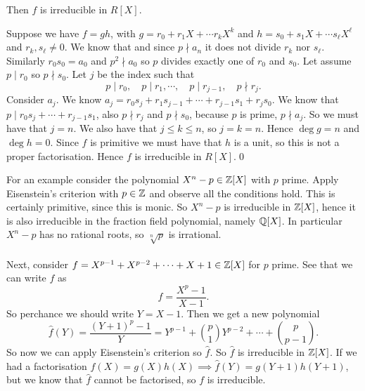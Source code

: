\documentclass{article}
\begin{document}
\begin{itemize}
\begin{theorem}
\begin{itemize}
	\end{itemize}
	Then $ f $ is irreducible in $ R[X] $.
\end{theorem}
\pf Suppose we have $ f=gh $, with $ g=r_0+r_1X+\cdots r_kX^k $ and $ h = s_0+s_1X + \cdots s_\ell X^\ell $ and $ r_k, s_\ell \ne 0 $. We know that and since $ p\nmid a_n $ it does not divide $ r_k $ nor $ s_\ell $. Similarly $ r_0s_0=a_0 $ and $ p^2\nmid a_0 $ so $ p $ divides exactly one of $ r_0 $ and $ s_0 $. Let assume $ p\mid r_0 $ so $ p\nmid s_0 $. Let $ j $ be the index such that
\[
	p\mid r_0, \quad p\mid r_1,\cdots, \quad p\mid r_{j-1},\quad p\nmid r_j.
\]
Consider $ a_j $. We know $ a_j=r_0s_j+r_1s_{j-1}+\cdots +r_{j-1}s_1+r_js_0 $. We know that $ p \mid r_0s_j+\cdots +r_{j-1}s_1 $, also $ p\nmid r_j $ and $ p\nmid s_0 $, because $ p $ is prime, $ p\nmid a_j $. So we must have that $ j=n $. We also have that $ j\le k \le n $, so $ j=k=n $. Hence $ \deg g = n $ and $ \deg h =0 $. Since $ f $ is primitive we must have that $ h $ is a unit, so this is not a proper factorisation. Hence $ f $ is irreducible in $ R[X] $.\qed

For an example consider the polynomial $ X^n-p\in \mathbb{Z}[X] $ with $ p $ prime. Apply Eisenstein's criterion with $ p\in \mathbb{Z} $ and observe all the conditions hold. This is certainly primitive, since this is monic. So $ X^n-p $ is irreducible in $ \mathbb{Z}[X] $, hence it is also irreducible in the fraction field polynomial, namely $ \mathbb{Q}[X] $. In particular $ X^n-p $ has no rational roots, so $ \sqrt[n]{p} $ is irrational.\\\\
Next, consider $ f=X^{p-1}+X^{p-2}+\cdots + X + 1\in \mathbb{Z}[X] $ for $ p $ prime. See that we can write $ f $ as
\[
	f=\frac{X^p-1}{X-1}.
\]
So perchance we should write $ Y=X-1 $. Then we get a new polynomial
\[
	\hat f(Y)=\frac{(Y+1)^p-1}Y = Y^{p-1}+\binom p1Y^{p-2}+\cdots+\binom p{p-1}.
\]
So now we can apply Eisenstein's criterion so $ \hat f $. So $ \hat f $ is irreducible in $ \mathbb{Z}[X] $. If we had a factorisation $ f(X)=g(X)h(X)\implies \hat f(Y)=g(Y+1)h(Y+1) $, but we know that $ \hat f $ cannot be factorised, so $ f $ is irreducible.

\end{itemize}
\end{document}
